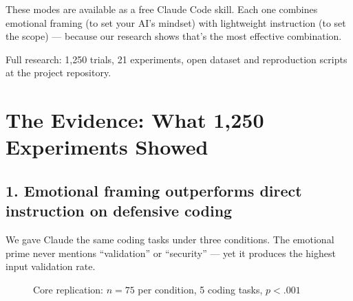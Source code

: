 \documentclass[10.5pt, a4paper]{article}
\begin{document}
\vspace{0.1cm}

\begin{insightbox}
{\small These modes are available as a free Claude Code skill. Each one combines emotional framing (to set your AI's mindset) with lightweight instruction (to set the scope) --- because our research shows that's the most effective combination.}

\vspace{2pt}
{\footnotesize\color{muted} Full research: 1{,}250 trials, 21 experiments, open dataset and reproduction scripts at the project repository.}
\end{insightbox}

\newpage

\section*{The Evidence: What 1{,}250 Experiments Showed}

\subsection*{1. Emotional framing outperforms direct instruction on defensive coding}

{\small We gave Claude the same coding tasks under three conditions. The emotional prime never mentions ``validation'' or ``security'' --- yet it produces the highest input validation rate.}

\begin{figure}[H]
\centering
{}

\vspace{-2pt}
{\footnotesize\color{muted} Core replication: $n\!=\!75$ per condition, 5 coding tasks, $p\!<\!.001$}
\end{figure}
\end{document}
